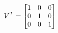 \documentclass[preview]{standalone}
\begin{document}
\begin{align*}
\special{dvisvgm:raw <g id='unique000'>}V^T = \begin{bmatrix} 1 & 0 & 0 \\ 0 & 1 & 0 \\ 0 & 0 & 1 \end{bmatrix}\special{dvisvgm:raw </g>}
\end{align*}
\end{document}
